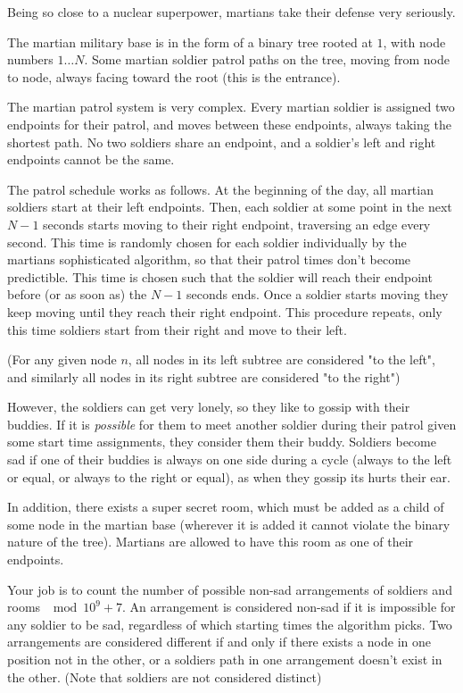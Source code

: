 
Being so close to a nuclear superpower, martians take their defense very seriously.

The martian military base is in the form of a binary tree rooted at $1$, with node numbers $1 \dots N$. Some martian soldier patrol paths on the tree, moving from node to node, always facing toward the root (this is the entrance). 

The martian patrol system is very complex. Every martian soldier is assigned two endpoints for their patrol, and moves between these endpoints, always taking the shortest path. No two soldiers share an endpoint, and a soldier's left and right endpoints cannot be the same.

The patrol schedule works as follows. At the beginning of the day, all martian soldiers start at their left endpoints. Then, each soldier at some point in the next $N-1$ seconds starts moving to their right endpoint, traversing an edge every second. This time is randomly chosen for each soldier individually by the martians sophisticated algorithm, so that their patrol times don't become predictible. This time is chosen such that the soldier will reach their endpoint before (or as soon as) the $N-1$ seconds ends. Once a soldier starts moving they keep moving until they reach their right endpoint. This procedure repeats, only this time soldiers start from their right and move to their left.

(For any given node $n$, all nodes in its left subtree are considered "to the left", and similarly all nodes in its right subtree are considered "to the right")

However, the soldiers can get very lonely, so they like to gossip with their buddies. If it is \emph{possible} for them to meet another soldier during their patrol given some start time assignments, they consider them their buddy. Soldiers become sad if one of their buddies is always on one side during a cycle (always to the left or equal, or always to the right or equal), as when they gossip its hurts their ear. 

In addition, there exists a super secret room, which must be added as a child of some node in the martian base (wherever it is added it cannot violate the binary nature of the tree). Martians are allowed to have this room as one of their endpoints.

Your job is to count the number of possible non-sad arrangements of soldiers and rooms $\mod 10^9 + 7$. An arrangement is considered non-sad if it is impossible for any soldier to be sad, regardless of which starting times the algorithm picks. Two arrangements are considered different if and only if there exists a node in one position not in the other, or a soldiers path in one arrangement doesn't exist in the other. (Note that soldiers are not considered distinct)

